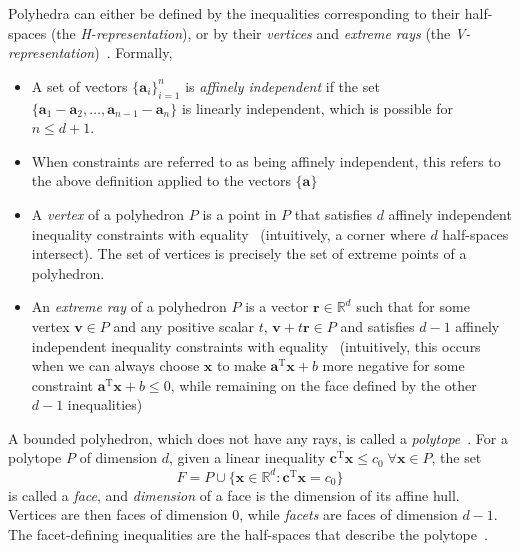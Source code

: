 \documentclass[10pt, a4paper]{article}
\numberwithin{equation}{section} %
\theoremstyle{definition}
\theoremstyle{plain}
\newcommand{\?}{\mathrel{?}} %
\newcommand{\R}{\mathbb{R}} %
\newcommand{\tpose}{\mathrm{T}}
\newcommand{\cvec}[1]{\boldsymbol{\mathbf{#1}}}    %
\newcommand{\rvec}[1]{\boldsymbol{\mathbf{#1}}^\tpose} %
\begin{document}
\begin{appendices}
                    Polyhedra can either be defined by the inequalities corresponding to their half-spaces (the \emph{H-representation}), or by their \emph{vertices} and \emph{extreme rays} (the \emph{V-representation})~\cite[Sec. 2]{LRS}. Formally,
                    \begin{itemize}
                      \item A set of vectors \({\{\cvec{a}_i\}}_{i=1}^n\) is \emph{affinely independent} if the set \(\{\cvec{a}_1-\cvec{a}_2, \ldots, \cvec{a}_{n-1}-\cvec{a}_n\}\) is linearly independent, which is possible for \(n \leq d+1\).
                      \item When constraints are referred to as being affinely independent, this refers to the above definition applied to the vectors \(\{\cvec{a}\}\)
                      \item A \emph{vertex} of a polyhedron \(P\) is a point in \(P\) that satisfies \(d\) affinely independent inequality constraints with equality~\cite[Sec. 2]{LRS} (intuitively, a corner where \(d\) half-spaces intersect). The set of vertices is precisely the set of extreme points of a polyhedron.
                      \item An \emph{extreme ray} of a polyhedron \(P\) is a vector \(\cvec{r}\in\R^d\) such that for some vertex \(\cvec{v}\in{P}\) and any positive scalar \(t\), \(\cvec{v} + t\cvec{r} \in P\) and satisfies \(d-1\) affinely independent inequality constraints with equality~\cite[Sec. 2]{LRS} (intuitively, this occurs when we can always choose \(\cvec{x}\) to make \(\rvec{a}\cvec{x} + b\) more negative for some constraint \(\rvec{a}\cvec{x} + b \leq 0\), while remaining on the face defined by the other \(d-1\) inequalities)
                    \end{itemize}

                    A bounded polyhedron, which does not have any rays, is called a \emph{polytope}~\cite[Ch. 1]{Ziegler}. For a polytope \(P\) of dimension \(d\), given a linear inequality \(\rvec{c}\cvec{x} \leq c_0\;\forall\cvec{x}\in{P}\), the set
                    \begin{equation}
                      F = P \cup \{\cvec{x}\in\R^d : \rvec{c}\cvec{x} = c_0\}
                    \end{equation}
                    is called a \emph{face}, and \emph{dimension} of a face is the dimension of its affine hull. Vertices are then faces of dimension \(0\), while \emph{facets} are faces of dimension \(d-1\). The facet-defining inequalities are the half-spaces that describe the polytope~\cite[Ch. 2]{Ziegler}.


\end{appendices}
\end{document}
